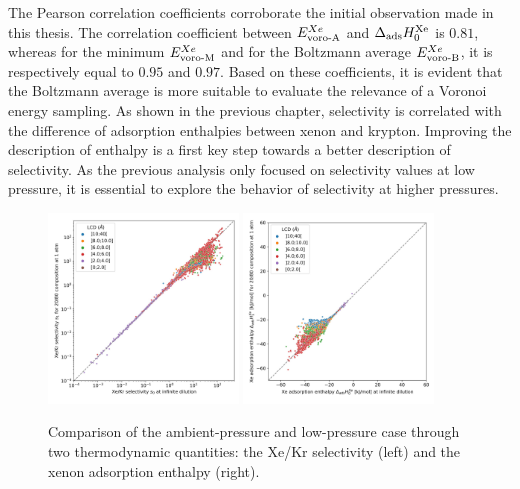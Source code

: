 \documentclass[main]{subfiles}
\begin{document}
The Pearson correlation coefficients corroborate the initial observation made in this thesis. The correlation coefficient between $E_{\text{voro-A}}^{Xe}$ and $\Delta_{\text{ads}} H_{0}^{\text{Xe}}$ is $0.81$, whereas for the minimum $E_{\text{voro-M}}^{Xe}$ and for the Boltzmann average $E_{\text{voro-B}}^{Xe}$, it is respectively equal to $0.95$ and $0.97$. Based on these coefficients, it is evident that the Boltzmann average is more suitable to evaluate the relevance of a Voronoi energy sampling. As shown in the previous chapter, selectivity is correlated with the difference of adsorption enthalpies between xenon and krypton. Improving the description of enthalpy is a first key step towards a better description of selectivity. As the previous analysis only focused on selectivity values at low pressure, it is essential to explore the behavior of selectivity at higher pressures.

\begin{figure}[ht]
  \centering
  \includegraphics[width=0.45\textwidth]{figures/3-fastsim/s_0_vs_s_2080_overview.jpg}
  \hfill
  \includegraphics[width=0.45\textwidth]{figures/3-fastsim/H_Xe_0_vs_H_Xe_2080_overview.jpg}
    \caption{Comparison of the ambient-pressure and low-pressure case through two thermodynamic quantities: the Xe/Kr selectivity (left) and the xenon adsorption enthalpy (right). }\label{fgr:compa_pressure}
\end{figure}
\end{document}

